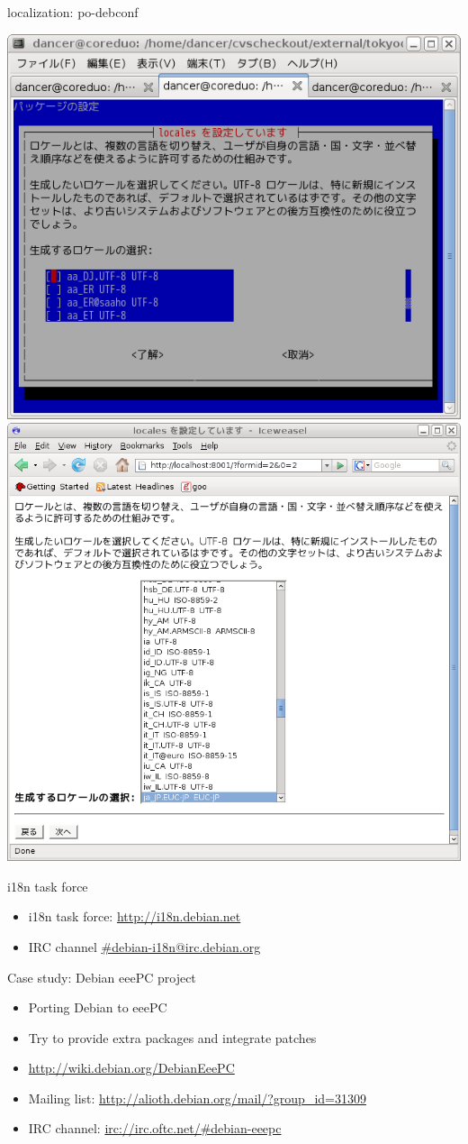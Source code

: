 \documentclass[cjk,dvipdfm,12pt]{beamer}
\begin{document}
\begin{frame}{localization: po-debconf}

 \includegraphics[width=0.5\hsize]{image200805/debconf-text.png}
 \includegraphics[width=0.5\hsize]{image200805/debconf-locales.png}

\end{frame}

\begin{frame}{i18n task force}
 \begin{itemize}
  \item i18n task force: \url{http://i18n.debian.net}
  \item IRC channel \url{\#debian-i18n@irc.debian.org}
 \end{itemize}
\end{frame}

\begin{frame}{Case study: Debian eeePC project}
 \begin{itemize}
  \item Porting Debian to eeePC
  \item Try to provide extra packages and integrate patches
  \item \url{http://wiki.debian.org/DebianEeePC}
  \item Mailing list: \url{http://alioth.debian.org/mail/?group_id=31309}
  \item IRC channel: \url{irc://irc.oftc.net/\#debian-eeepc}
 \end{itemize}
\end{frame}
\end{document}
